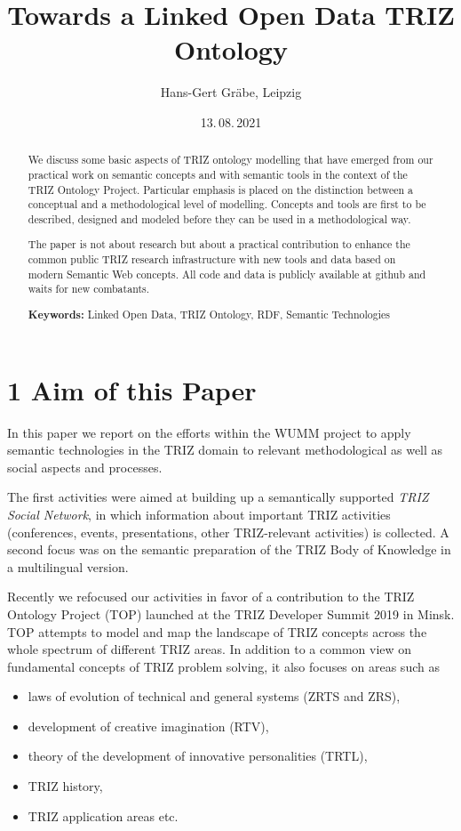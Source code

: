 \documentclass[12pt,a4paper]{article}
\title{Towards a Linked Open Data TRIZ Ontology}
\author{Hans-Gert Gräbe, Leipzig}
\date{13.\,08.\,2021}
\begin{document}
\maketitle
\begin{abstract}
  We discuss some basic aspects of TRIZ ontology modelling that have emerged
  from our practical work on semantic concepts and with semantic tools in the
  context of the TRIZ Ontology Project. Particular emphasis is placed on the
  distinction between a conceptual and a methodological level of modelling.
  Concepts and tools are first to be described, designed and modeled before
  they can be used in a methodological way.
  
  The paper is not about research but about a practical contribution to
  enhance the common public TRIZ research infrastructure with new tools and
  data based on modern Semantic Web concepts. All code and data is publicly
  available at github \cite{25} and waits for new combatants.\bigskip

  \textbf{Keywords:} Linked Open Data, TRIZ Ontology, RDF, Semantic
  Technologies
\end{abstract}

\section*{1 Aim of this Paper}

In this paper we report on the efforts within the WUMM project \cite{26} to
apply semantic technologies in the TRIZ domain to relevant methodological as
well as social aspects and processes.

The first activities were aimed at building up a semantically supported
\emph{TRIZ Social Network}, in which information about important TRIZ
activities (conferences, events, presentations, other TRIZ-relevant
activities) is collected. A second focus was on the semantic preparation of
the TRIZ Body of Knowledge \cite{14,15} in a multilingual version.

Recently we refocused our activities in favor of a contribution to the TRIZ
Ontology Project (TOP) launched at the TRIZ Developer Summit 2019 in Minsk.
TOP attempts to model and map the landscape of TRIZ concepts across the whole
spectrum of different TRIZ areas. In addition to a common view on fundamental
concepts of TRIZ problem solving, it also focuses on areas such as
\begin{itemize}
 \item laws of evolution of technical and general systems (ZRTS and ZRS),
 \item development of creative imagination (RTV),
 \item theory of the development of innovative personalities (TRTL),
 \item TRIZ history,
 \item TRIZ application areas etc.
\end{itemize}
\end{document}
